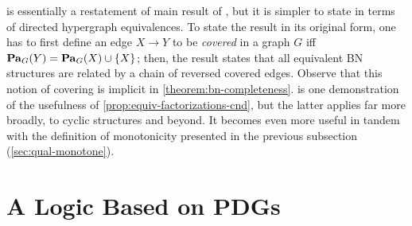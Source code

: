 is essentially a restatement of
main result of \citet{chickering-equiv-bns}, 
but it is simpler to state in terms of directed hypergraph equivalences.
To state the result in its original form, one has to first
define an edge $X \to Y$ to be \emph{covered} in a graph $G$ iff $\mathop{\mathbf{Pa}}\nolimits_G(Y) = \mathop{\mathbf{Pa}}\nolimits_G(X) \cup \{X\}$;
then, the result states that all equivalent BN structures are related by a chain of reversed covered edges. 
Observe that this notion of covering is implicit in \cref{theorem:bn-completeness}.
 is one demonstration of the usefulness of 
\cref{prop:equiv-factorizations-cnd},
but the latter applies far more broadly, to cyclic structures
and beyond. 
It becomes even more useful in tandem
    with the definition of monotonicity presented in the 
    previous subsection (\cref{sec:qual-monotone}).
    




\section{A Logic Based on PDGs}
    \label{sec:pdg-logic}

